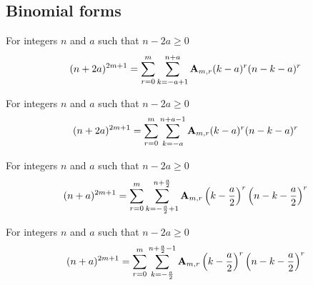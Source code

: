 \subsection{Binomial forms}\label{subsec:binomial-forms}

\begin{corollary}
    \label{prop:odd-power-binomial-plus}
    For integers $n$ and $a$ such that $n-2a \geq 0$
    \begin{align*}
    (n+2a)^{2m+1} = \sum_{r=0}^{m} \sum_{k=-a+1}^{n+a} {\mathbf{A}} \sb{m,r} (k-a)^r (n-k-a)^r
    \end{align*}
\end{corollary}

\begin{corollary}
    \label{prop:odd-power-binomial-plus-shifted}
    For integers $n$ and $a$ such that $n-2a \geq 0$
    \begin{align*}
    (n+2a)^{2m+1} = \sum_{r=0}^{m} \sum_{k=-a}^{n+a-1} {\mathbf{A}} \sb{m,r} (k-a)^r (n-k-a)^r
    \end{align*}
\end{corollary}

\begin{corollary}
    \label{cor:odd-power-binomial-centered}
    For integers $n$ and $a$ such that $n-2a \geq 0$
    \begin{align*}
    (n+a)^{2m+1} = \sum_{r=0}^{m} \sum_{k=-\frac{a}{2}+1}^{n+\frac{a}{2}} {\mathbf{A}} \sb{m,r} \left( k-\frac{a}{2} \right)^r \left( n-k-\frac{a}{2} \right)^r
    \end{align*}
\end{corollary}

\begin{corollary}
    \label{cor:odd-power-binomial-centered-shifted}
    For integers $n$ and $a$ such that $n-2a \geq 0$
    \begin{align*}
    (n+a)^{2m+1} = \sum_{r=0}^{m} \sum_{k=-\frac{a}{2}}^{n+\frac{a}{2}-1} {\mathbf{A}} \sb{m,r} \left( k-\frac{a}{2} \right)^r \left( n-k-\frac{a}{2} \right)^r
    \end{align*}
\end{corollary}

